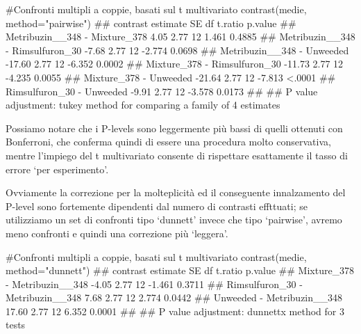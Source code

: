 \documentclass[a4paper,12pt,oneside]{book}
\newenvironment{Shaded}{\begin{snugshade}}{\end{snugshade}}
\newcommand{\StringTok}[1]{#1}
\newcommand{\CommentTok}[1]{#1}
\newcommand{\DocumentationTok}[1]{#1}
\newcommand{\FunctionTok}[1]{#1}
\newcommand{\AttributeTok}[1]{#1}
\newcommand{\NormalTok}[1]{#1}
\begin{document}
\begin{Shaded}
\begin{Highlighting}[]
\CommentTok{\#Confronti multipli a coppie, basati sul t multivariato}
\FunctionTok{contrast}\NormalTok{(medie, }\AttributeTok{method=}\StringTok{"pairwise"}\NormalTok{)}
\DocumentationTok{\#\#  contrast                         estimate   SE df t.ratio p.value}
\DocumentationTok{\#\#  Metribuzin\_\_348 {-} Mixture\_378        4.05 2.77 12   1.461  0.4885}
\DocumentationTok{\#\#  Metribuzin\_\_348 {-} Rimsulfuron\_30    {-}7.68 2.77 12  {-}2.774  0.0698}
\DocumentationTok{\#\#  Metribuzin\_\_348 {-} Unweeded         {-}17.60 2.77 12  {-}6.352  0.0002}
\DocumentationTok{\#\#  Mixture\_378 {-} Rimsulfuron\_30       {-}11.73 2.77 12  {-}4.235  0.0055}
\DocumentationTok{\#\#  Mixture\_378 {-} Unweeded             {-}21.64 2.77 12  {-}7.813  \textless{}.0001}
\DocumentationTok{\#\#  Rimsulfuron\_30 {-} Unweeded           {-}9.91 2.77 12  {-}3.578  0.0173}
\DocumentationTok{\#\# }
\DocumentationTok{\#\# P value adjustment: tukey method for comparing a family of 4 estimates}
\end{Highlighting}
\end{Shaded}

\normalsize

Possiamo notare che i P-levels sono leggermente più bassi di quelli ottenuti con Bonferroni, che conferma quindi di essere una procedura molto conservativa, mentre l'impiego del t multivariato consente di rispettare esattamente il tasso di errore `per esperimento'.

Ovviamente la correzione per la molteplicità ed il conseguente innalzamento del P-level sono fortemente dipendenti dal numero di contrasti effttuati; se utilizziamo un set di confronti tipo `dunnett' invece che tipo `pairwise', avremo meno confronti e quindi una correzione più `leggera'.

\begin{Shaded}
\begin{Highlighting}[]
\CommentTok{\#Confronti multipli a coppie, basati sul t multivariato}
\FunctionTok{contrast}\NormalTok{(medie, }\AttributeTok{method=}\StringTok{"dunnett"}\NormalTok{)}
\DocumentationTok{\#\#  contrast                         estimate   SE df t.ratio p.value}
\DocumentationTok{\#\#  Mixture\_378 {-} Metribuzin\_\_348       {-}4.05 2.77 12  {-}1.461  0.3711}
\DocumentationTok{\#\#  Rimsulfuron\_30 {-} Metribuzin\_\_348     7.68 2.77 12   2.774  0.0442}
\DocumentationTok{\#\#  Unweeded {-} Metribuzin\_\_348          17.60 2.77 12   6.352  0.0001}
\DocumentationTok{\#\# }
\DocumentationTok{\#\# P value adjustment: dunnettx method for 3 tests}
\end{Highlighting}
\end{Shaded}
\end{document}
